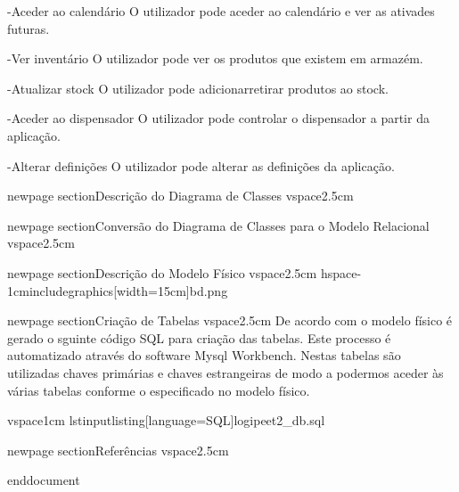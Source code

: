 -Aceder ao calendário O utilizador pode aceder ao calendário e ver as ativades futuras.

-Ver inventário O utilizador pode ver os produtos que existem em armazém.

-Atualizar stock O utilizador pode adicionarretirar produtos ao stock.

-Aceder ao dispensador O utilizador pode controlar o dispensador a partir da aplicação.

-Alterar definições O utilizador pode alterar as definições da aplicação.


newpage
section{Descrição do Diagrama de Classes}
vspace{2.5cm}

newpage
section{Conversão do Diagrama de Classes para o Modelo 
Relacional}
vspace{2.5cm}

newpage
section{Descrição do Modelo Físico}
vspace{2.5cm}
hspace{-1cm}includegraphics[width=15cm]{bd.png}

newpage
section{Criação de Tabelas}
vspace{2.5cm}
De acordo com o modelo físico é gerado o sguinte código SQL para criação das tabelas. Este processo é automatizado através do software Mysql Workbench.
Nestas tabelas são utilizadas chaves primárias e chaves estrangeiras de modo a podermos aceder às várias tabelas conforme o especificado no modelo físico.

vspace{1cm}
lstinputlisting[language=SQL]{logipeet2_db.sql}

newpage
section{Referências}
vspace{2.5cm}


end{document}